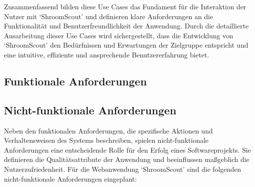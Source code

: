 \documentclass[../main.tex]{subfiles} %
\begin{document}
Zusammenfassend bilden diese Use Cases das Fundament für die Interaktion der Nutzer mit `ShroomScout' und definieren klare
Anforderungen an die Funktionalität und Benutzerfreundlichkeit der Anwendung. Durch die detaillierte Ausarbeitung dieser Use
Cases wird sichergestellt, dass die Entwicklung von `ShroomScout' den Bedürfnissen und Erwartungen der Zielgruppe entspricht
und eine intuitive, effiziente und ansprechende Benutzererfahrung bietet.

\subsection{Funktionale Anforderungen} %

\subsection{Nicht-funktionale Anforderungen}

Neben den funktionalen Anforderungen, die spezifische Aktionen und Verhaltensweisen des Systems beschreiben, spielen
nicht-funktionale Anforderungen eine entscheidende Rolle für den Erfolg eines Softwareprojekts. Sie definieren die
Qualitätsattribute der Anwendung und beeinflussen maßgeblich die Nutzerzufriedenheit. Für die Webanwendung `ShroomScout'
sind die folgenden nicht-funktionale Anforderungen eingeplant:
\end{document}
